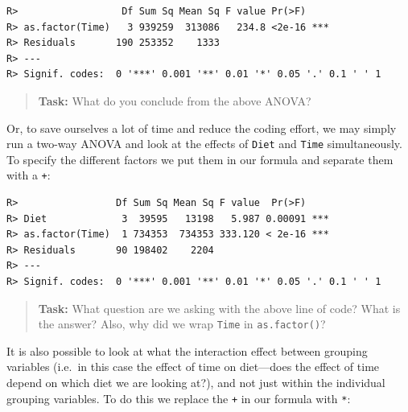 \documentclass[english,10pt,a4paper,oneside]{book}
\newenvironment{Shaded}{\begin{snugshade}}{\end{snugshade}}
\newcommand{\DataTypeTok}[1]{\textcolor[rgb]{0.13,0.29,0.53}{#1}}
\newcommand{\DecValTok}[1]{\textcolor[rgb]{0.00,0.00,0.81}{#1}}
\newcommand{\KeywordTok}[1]{\textcolor[rgb]{0.13,0.29,0.53}{\textbf{#1}}}
\newcommand{\NormalTok}[1]{#1}
\newcommand{\OperatorTok}[1]{\textcolor[rgb]{0.81,0.36,0.00}{\textbf{#1}}}
\newcommand{\StringTok}[1]{\textcolor[rgb]{0.31,0.60,0.02}{#1}}
\theoremstyle{definition}
\theoremstyle{definition}
\theoremstyle{definition}
\theoremstyle{remark}
\begin{document}
\begin{verbatim}
R>                  Df Sum Sq Mean Sq F value Pr(>F)    
R> as.factor(Time)   3 939259  313086   234.8 <2e-16 ***
R> Residuals       190 253352    1333                   
R> ---
R> Signif. codes:  0 '***' 0.001 '**' 0.01 '*' 0.05 '.' 0.1 ' ' 1
\end{verbatim}

\begin{quote}
\textbf{Task:} What do you conclude from the above ANOVA?
\end{quote}

Or, to save ourselves a lot of time and reduce the coding effort, we may
simply run a two-way ANOVA and look at the effects of \texttt{Diet} and
\texttt{Time} simultaneously. To specify the different factors we put
them in our formula and separate them with a \texttt{+}:

\begin{Shaded}
\end{Shaded}

\begin{verbatim}
R>                 Df Sum Sq Mean Sq F value  Pr(>F)    
R> Diet             3  39595   13198   5.987 0.00091 ***
R> as.factor(Time)  1 734353  734353 333.120 < 2e-16 ***
R> Residuals       90 198402    2204                    
R> ---
R> Signif. codes:  0 '***' 0.001 '**' 0.01 '*' 0.05 '.' 0.1 ' ' 1
\end{verbatim}

\begin{quote}
\textbf{Task:} What question are we asking with the above line of code?
What is the answer? Also, why did we wrap \texttt{Time} in
\texttt{as.factor()}?
\end{quote}

It is also possible to look at what the interaction effect between
grouping variables (i.e.~in this case the effect of time on diet---does
the effect of time depend on which diet we are looking at?), and not
just within the individual grouping variables. To do this we replace the
\texttt{+} in our formula with \texttt{*}:
\end{document}
